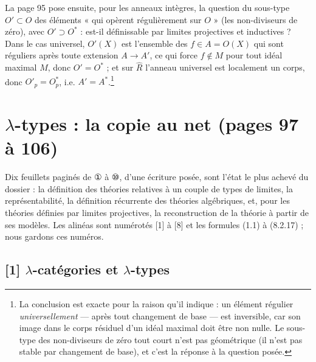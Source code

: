 \documentclass[11pt,a4paper]{article}
\begin{document}
La page 95 pose ensuite, pour les anneaux intègres, la question du
sous-type $O' \subset O$ des éléments « qui opèrent régulièrement sur $O$ »
(les non-diviseurs de zéro), avec $O' \supset O^{*}$ : est-il définissable
par limites projectives et inductives ? Dans le cas universel, $O'(X)$ est
l'ensemble des $f \in A = O(X)$ qui sont réguliers après toute extension
$A \to A'$, ce qui force $f \notin M$ pour tout idéal maximal $M$, donc
$O' = O^{*}$ ; et sur $\widehat{R}$ l'anneau universel est localement un
corps, donc $O'_{p} = O^{*}_{p}$, i.e. $A' = A^{*}$.\footnote{La conclusion
est exacte pour la raison qu'il indique : un élément régulier
\emph{universellement} — après tout changement de base — est inversible,
car son image dans le corps résiduel d'un idéal maximal doit être non
nulle. Le sous-type des non-diviseurs de zéro tout court n'est pas
géométrique (il n'est pas stable par changement de base), et c'est la
réponse à la question posée.}

\section*{$\lambda$-types : la copie au net (pages 97 à 106)}

Dix feuillets paginés de ① à ⑩, d'une écriture posée, sont l'état le plus
achevé du dossier : la définition des théories relatives à un couple de
types de limites, la représentabilité, la définition récurrente des
théories algébriques, et, pour les théories définies par limites
projectives, la reconstruction de la théorie à partir de ses modèles. Les
alinéas sont numérotés [1] à [8] et les formules (1.1) à (8.2.17) ; nous
gardons ces numéros.

\subsection*{[1] $\lambda$-catégories et $\lambda$-types}
\end{document}
